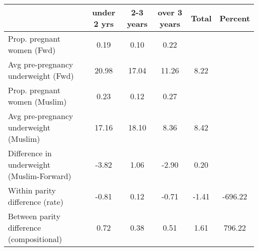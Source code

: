 \begin{tabular}{l*{5}{c}}
\toprule
            &\multicolumn{1}{c}{under 2 yrs}&\multicolumn{1}{c}{2-3 years}&\multicolumn{1}{c}{over 3 years}&\multicolumn{1}{c}{Total}&\multicolumn{1}{c}{Percent}\\
\midrule
\midrule
Prop. pregnant women (Fwd)&        0.19&        0.10&        0.22&            &            \\
Avg pre-pregnancy underweight (Fwd)&       20.98&       17.04&       11.26&        8.22&            \\
Prop. pregnant women (Muslim)&        0.23&        0.12&        0.27&            &            \\
Avg pre-pregnancy underweight (Muslim)&       17.16&       18.10&        8.36&        8.42&            \\
Difference in underweight (Muslim-Forward)&       -3.82&        1.06&       -2.90&        0.20&            \\
Within parity difference (rate)&       -0.81&        0.12&       -0.71&       -1.41&     -696.22\\
Between parity difference (compositional)&        0.72&        0.38&        0.51&        1.61&      796.22\\
\bottomrule
\end{tabular}

